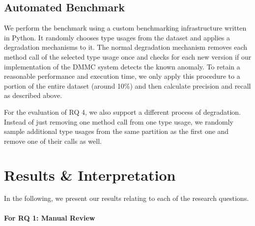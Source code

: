 
\subsection{Automated Benchmark}

We perform the benchmark using a custom benchmarking infrastructure written in Python.
It randomly chooses type usages from the dataset and applies a degradation mechanisms to it.
The normal degradation mechanism removes each method call of the selected type usage once and checks for each new version if our implementation of the $\text{DMMC}$ system detects the known anomaly.
To retain a reasonable performance and execution time, we only apply this procedure to a portion of the entire dataset (around 10\%) and then calculate precision and recall as described above.

For the evaluation of RQ 4, we also support a different process of degradation.
Instead of just removing one method call from one type usage, we randomly sample additional type usages from the same partition as the first one and remove one of their calls as well.

\section{Results \& Interpretation}

In the following, we present our results relating to each of the research questions.

\paragraph{For RQ 1: Manual Review}

